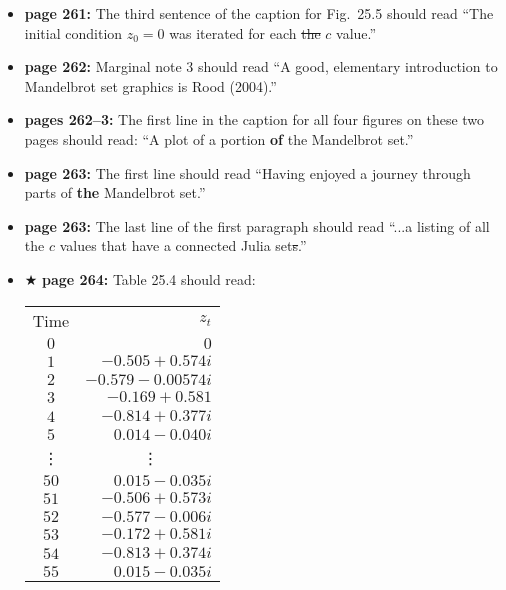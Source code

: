 \documentclass[12pt]{article}
\begin{document}
\begin{itemize}


  \item {\bf page 261:} The third sentence of the caption for
    Fig.~25.5 should read ``The initial condition $z_0 = 0$ was
    iterated for each \sout{the} $c$ value.''

  \item {\bf page 262:}  Marginal note 3 should read ``A good,
    elementary introduction to Mandelbrot set graphics is Rood
    (2004).'' %

  \item {\bf pages 262--3:}  The first line in the caption for all
    four figures on these two pages should read: ``A plot of a portion
    {\bf of} the Mandelbrot set.'' %

  \item {\bf page 263:}  The first line should read ``Having enjoyed a
    journey through parts of {\bf the} Mandelbrot set.''

  \item {\bf page 263:} The last line of the first paragraph should
    read ``...a listing of all the $c$ values that have a connected
    Julia set\sout{s}.''


  \item $\bigstar$ {\bf page 264:} Table 25.4 should read:
\begin{center}
\begin{tabular}{c r}
\hline
\vspace{2mm}Time & $z_t$ \\
$0$ & \hspace{9mm} $0$ \\
$1$ &	$-0.505 + 0.574i$ \\
$2$ &	$-0.579	-0.00574i$ \\
$3$ & 	$-0.169 + 0.581$ \\
$4$ &	$-0.814	+ 0.377i$ \\
$5$ &	$0.014 -0.040i$\\
\vdots & \vdots $\;\;\;\;\;\;\;\;\;\;\;\;$\hspace{11mm}\\
$50$ &	$0.015  - 0.035i$ \\
$51$ &	$-0.506 + 0.573i$ \\
$52$ &	$-0.577 - 0.006i$ \\
$53$ &  $-0.172 + 0.581i$ \\
$54$ & $ -0.813 + 0.374i$\\
$55$ & $0.015 - 0.035i$\\
\hline
\end{tabular}
\end{center}


\end{itemize}
\end{document}
